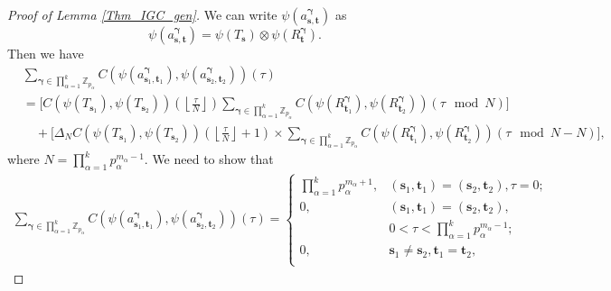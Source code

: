 \documentclass[pdflatex,sn-mathphys-num]{sn-jnl}%
\theoremstyle{thmstyleone}
\newcommand{\floor}[1]{\left\lfloor #1 \right\rfloor}
\begin{document}
	\begin{proof}[Proof of Lemma \ref{Thm_IGC_gen}]
		We can write $\psi(a_{\mathbf{s},\mathbf{t}}^{\bm{\gamma}} )$ as
		\begin{equation}
			\psi(a_{\mathbf{s},\mathbf{t}}^{\bm{\gamma}} )  = \psi( T_{\mathbf{s}}) \otimes \psi (R_{\mathbf{t}}^{\bm{\gamma}} ).
		\end{equation} 
		Then we have
		\begin{equation}\label{eqn_Kronecker_detailed}
			\begin{split}
				& \sum_{\bm{\gamma} \in \prod_{\alpha=1}^{k} \mathbb{Z}_{p_\alpha}}^{} C\left( \psi(a_{\mathbf{s}_1,\mathbf{t}_1}^{\bm{\gamma}} ), \psi(a_{\mathbf{s}_2,\mathbf{t}_2}^{\bm{\gamma}} ) \right) (\tau)\\
				&= \bigg[ C\left( \psi( T_{\mathbf{s}_1}), \psi( T_{\mathbf{s}_2}) \right) \left( \floor{\frac{\tau}{N}}\right) \sum_{\bm{\gamma} \in \prod_{\alpha=1}^{k} \mathbb{Z}_{p_\alpha}}^{}  C \left( \psi (R_{\mathbf{t}_1}^{\bm{\gamma}} ), \psi (R_{\mathbf{t}_2}^{\bm{\gamma}} ) \right) \left(\tau  \mod N \right) \bigg]\\
				& \quad + \bigg[\Delta_N C\left( \psi( T_{\mathbf{s}_1}), \psi( T_{\mathbf{s}_2}) \right) \left( \floor{\frac{\tau}{N}} +1\right)  \times \sum_{\bm{\gamma} \in \prod_{\alpha=1}^{k} \mathbb{Z}_{p_\alpha}}^{} \!\!\!\!\!\!\! C \left( \psi (R_{\mathbf{t}_1}^{\bm{\gamma}} ), \psi (R_{\mathbf{t}_2}^{\bm{\gamma}} ) \right) \left(\tau \mod N -N\right) \bigg],
			\end{split}
		\end{equation}
		where $N= \prod_{\alpha=1}^{k} p_\alpha^{m_\alpha-1}$.
		We need to show that
		\begin{equation}\label{Thm_2_main_eqn_1}
			\begin{split}
				\sum_{\bm{\gamma} \in \prod_{\alpha=1}^{k} \mathbb{Z}_{p_\alpha}}^{} C\left( \psi(a_{\mathbf{s}_1,\mathbf{t}_1}^{\bm{\gamma}} ), \psi(a_{\mathbf{s}_2,\mathbf{t}_2}^{\bm{\gamma}} ) \right) (\tau)
				=
				\begin{cases}
					\prod_{\alpha=1}^{k} p_\alpha^{m_\alpha+1}, & \left( \mathbf{s}_1, \mathbf{t}_1 \right) = \left( \mathbf{s}_2, \mathbf{t}_2 \right),  \tau=0;\\
					0, & \left( \mathbf{s}_1, \mathbf{t}_1 \right) = \left( \mathbf{s}_2, \mathbf{t}_2 \right), \\
					&0 < \tau < \prod_{\alpha=1}^{k} p_\alpha^{m_\alpha-1};\\
					0, & \mathbf{s}_1 \neq \mathbf{s}_2, \mathbf{t}_1 =\mathbf{t}_2,\\

\end{cases}
\end{split}
\end{equation}
\end{proof}
\end{document}
